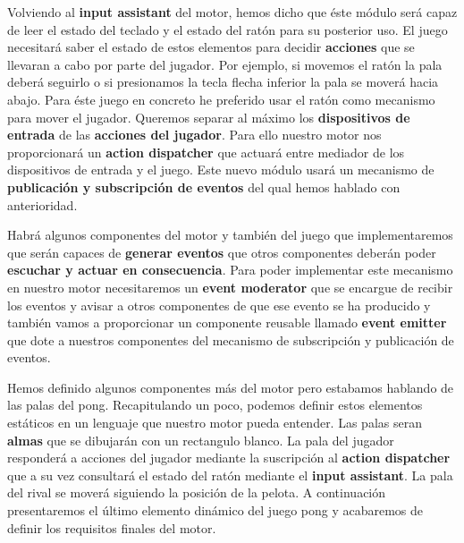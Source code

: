 \documentclass[a4paper]{article}
\begin{document}
Volviendo al \textbf{input assistant} del motor, hemos dicho que éste módulo será capaz de leer el estado del teclado y el estado del ratón para su posterior uso. El juego necesitará saber el estado de estos elementos para decidir \textbf{acciones} que se llevaran a cabo por parte del jugador. Por ejemplo, si movemos el ratón la pala deberá seguirlo o si presionamos la tecla flecha inferior la pala se moverá hacia abajo. Para éste juego en concreto he preferido usar el ratón como mecanismo para mover el jugador. Queremos separar al máximo los \textbf{dispositivos de entrada} de las \textbf{acciones del jugador}. Para ello nuestro motor nos proporcionará un \textbf{action dispatcher} que actuará entre mediador de los dispositivos de entrada y el juego. Este nuevo módulo usará un mecanismo de \textbf{publicación y subscripción de eventos} del qual hemos hablado con anterioridad.

Habrá algunos componentes del motor y también del juego que implementaremos que serán capaces de \textbf{generar eventos} que otros componentes deberán poder \textbf{escuchar y actuar en consecuencia}. Para poder implementar este mecanismo en nuestro motor necesitaremos un \textbf{event moderator} que se encargue de recibir los eventos y avisar a otros componentes de que ese evento se ha producido y también vamos a proporcionar un componente reusable llamado \textbf{event emitter} que dote a nuestros componentes del mecanismo de subscripción y publicación de eventos.

Hemos definido algunos componentes más del motor pero estabamos hablando de las palas del pong. Recapitulando un poco, podemos definir estos elementos estáticos en un lenguaje que nuestro motor pueda entender. Las palas seran \textbf{almas} que se dibujarán con un rectangulo blanco. La pala del jugador responderá a acciones del jugador mediante la suscripción al \textbf{action dispatcher} que a su vez consultará el estado del ratón mediante el \textbf{input assistant}. La pala del rival se moverá siguiendo la posición de la pelota. A continuación presentaremos el último elemento dinámico del juego pong y acabaremos de definir los requisitos finales del motor.
\end{document}

